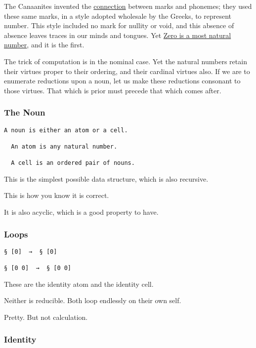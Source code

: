 \documentclass[twoside]{article}
\begin{document}
The Canaanites invented the \href{https://en.wikipedia.org/wiki/Alphabet}{connection} between marks and phonemes; they used these same marks, in a style adopted wholesale by the Greeks, to represent number. This style included no mark for nullity or void, and this absence of absence leaves traces in our minds and tongues. Yet \href{https://www.cs.utexas.edu/users/EWD/transcriptions/EWD08xx/EWD831.html}{Zero is a most natural number}, and it is the first.

The trick of computation is in the nominal case. Yet the natural numbers retain their virtues proper to their ordering, and their cardinal virtues also. If we are to enumerate reductions upon a noun, let us make these reductions consonant to those virtues. That which is prior must precede that which comes after.

\subsubsection{The Noun}

\begin{lstlisting}[style=listingblock]
  A noun is either an atom or a cell.

  An atom is any natural number.

  A cell is an ordered pair of nouns.
\end{lstlisting}

This is the simplest possible data structure, which is also recursive.

This is how you know it is correct.

It is also acyclic, which is a good property to have.

\subsubsection{Loops}

\begin{lstlisting}[style=listingblock]
§ [0]  →  § [0]

§ [0 0]  →  § [0 0]
\end{lstlisting}

These are the identity atom and the identity cell.

Neither is reducible. Both loop endlessly on their own self.

Pretty. But not calculation.

\subsubsection{Identity}
\end{document}
